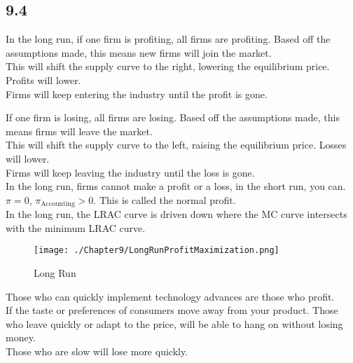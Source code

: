 \subsection*{9.4}
In the long run, if one firm is profiting, all firms are profiting. Based off the assumptions made, this means new firms will join the market.\\
This will shift the supply curve to the right, lowering the equilibrium price. Profits will lower.\\
Firms will keep entering the industry until the profit is gone.
\par
If one firm is losing, all firms are losing. Based off the assumptions made, this means firms will leave the market.\\
This will shift the supply curve to the left, raising the equilibrium price. Losses will lower.\\
Firms will keep leaving the industry until the loss is gone.\\
In the long run, firms cannot make a profit or a loss, in the short run, you can.\\
$\pi=0$, $\pi_{\text{Accounting}}>0$. This is called the normal profit.\\
In the long run, the LRAC curve is driven down where the MC curve intersects with the minimum LRAC curve.
\begin{figure}[H]
    \centering
    \texttt{[image: ./Chapter9/LongRunProfitMaximization.png]}
    \caption{Long Run}
\end{figure}
Those who can quickly implement technology advances are those who profit.\\
If the taste or preferences of consumers move away from your product. Those who 
leave quickly or adapt to the price, will be able to hang on without losing money.\\
Those who are slow will lose more quickly.
